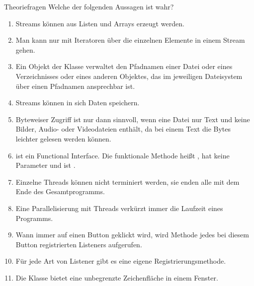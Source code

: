 \documentclass{../tuda-exercise}
\begin{document}
  \maketitle

  \begin{task}[credit = \stars{0}{3}]{Theoriefragen}
    Welche der folgenden Aussagen ist wahr?
    \begin{enumerate}
      [label = (\Alph*)]
      \item Streams können aus Listen und Arrays erzeugt werden.
      \item Man kann nur mit Iteratoren über die einzelnen Elemente in einem Stream gehen.
      \item Ein Objekt der Klasse  verwaltet den Pfadnamen einer Datei oder
      eines Verzeichnisses oder eines anderen Objektes, das im jeweiligen Dateisystem über einen
      Pfadnamen ansprechbar ist.
      \item Streams können in sich Daten speichern.
      \item Byteweiser Zugriff ist nur dann sinnvoll, wenn eine Datei nur Text und keine Bilder,
      Audio- oder Videodateien enthält, da bei einem Text die Bytes leichter gelesen werden können.
      \item {} ist ein Functional Interface. Die funktionale Methode heißt
      , hat keine Parameter und ist .
      \item Einzelne Threads können nicht terminiert werden, sie enden alle mit dem Ende des
      Gesamtprogramms.
      \item Eine Parallelisierung mit Threads verkürzt immer die Laufzeit eines Programms.
      \item Wann immer auf einen Button geklickt wird, wird Methode 
      jedes bei diesem Button registrierten Listeners aufgerufen.
      \item Für jede Art von Listener gibt es eine eigene Registrierungsmethode.
      \item Die Klasse  bietet eine unbegrenzte Zeichenfläche in einem Fenster.
    \end{enumerate}

    \clearpagesolution


\end{task}
\end{document}
